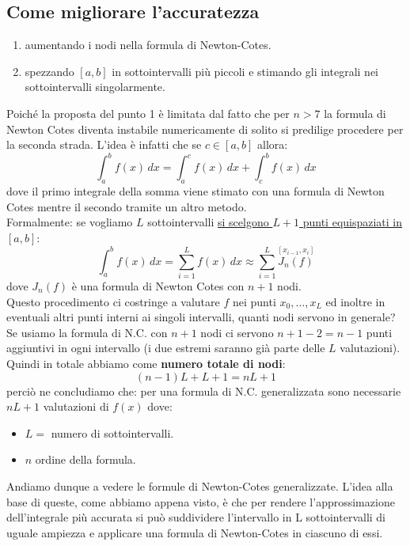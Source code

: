 \documentclass[12pt,a4paper,]{report}
\begin{document}
\begin{lezione}
    [Lezione 18 03/05]
\end{lezione}

\subsection{Come migliorare l'accuratezza}
\begin{enumerate}
    \item aumentando i nodi nella formula di Newton-Cotes.
    \item spezzando $[a,b]$ in sottointervalli più piccoli e stimando gli integrali nei sottointervalli singolarmente.
\end{enumerate}
Poiché la proposta del punto 1 è limitata dal fatto che per $n>7$ la formula di Newton Cotes diventa instabile numericamente di solito si predilige procedere per la seconda strada.
L'idea è infatti che se $c\in[a,b]$ allora:
\[
\int_a^bf(x)\,dx = \int_a^cf(x)\,dx + \int_c^bf(x)\,dx 
\]
dove il primo integrale della somma viene stimato con una formula di Newton Cotes mentre il secondo tramite un altro metodo.\\
Formalmente: se vogliamo $L$ sottointervalli \uline{si scelgono $L+1$ punti equispaziati in $[a,b]$}:
\[
\int_a^b f(x)\,dx = \sum_{i=1}^L f(x)\,dx \approx \sum_{i=1}^L \overset{[x_{i-1}, x_i]}{J_n(f)}
\]
dove $J_n(f)$ è una formula di Newton Cotes con $n+1$ nodi.\\
Questo procedimento ci costringe a valutare $f$ nei punti $x_0, \dots, x_L$ ed inoltre in eventuali altri punti interni ai singoli intervalli, quanti nodi servono in generale?\\
Se usiamo la formula di N.C. con $n+1$ nodi ci servono $n+1-2 = n-1$ punti aggiuntivi in ogni intervallo (i due estremi saranno già parte delle $L$ valutazioni).
Quindi in totale abbiamo come \textbf{numero totale di nodi}:
\[
(n-1)L + L+1 = \boxed{nL+1}
\]
perciò ne concludiamo che: per una formula di N.C. generalizzata sono necessarie $nL+1$ valutazioni di $f(x)$ dove:
\begin{itemize}
    \item $L=$ numero di sottointervalli.
    \item $n$ ordine della formula.
\end{itemize}

Andiamo dunque a vedere le formule di Newton-Cotes generalizzate.
L'idea alla base di queste, come abbiamo appena visto, è che per rendere l'approssimazione dell'integrale più accurata si può suddividere l'intervallo in L sottointervalli di uguale ampiezza e applicare una formula di Newton-Cotes in ciascuno di essi.
\end{document}
